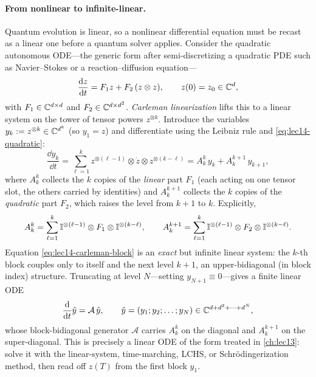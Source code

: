 \paragraph{From nonlinear to infinite-linear.}
Quantum evolution is linear, so a nonlinear differential equation must be recast as a linear one
before a quantum solver applies. Consider the quadratic autonomous ODE---the generic form after
semi-discretizing a quadratic PDE such as Navier--Stokes or a reaction--diffusion equation---
\begin{equation}
  \frac{\mathrm{d} z}{\mathrm{d} t}=F_1 z+F_2\,(z\otimes z),\qquad z(0)=z_0\in\mathbb{C}^d,
  \label{eq:lec14-quadratic}
\end{equation}
with $F_1\in\mathbb{C}^{d\times d}$ and $F_2\in\mathbb{C}^{d\times d^2}$. \emph{Carleman linearization} lifts this
to a linear system on the tower of tensor powers $z^{\otimes k}$. Introduce the variables
$y_k:=z^{\otimes k}\in\mathbb{C}^{d^k}$ (so $y_1=z$) and differentiate using the Leibniz rule and
\eqref{eq:lec14-quadratic}:
\begin{equation}
  \frac{\dd y_k}{\dd t}
  =\sum_{\ell=1}^{k}z^{\otimes(\ell-1)}\otimes\dot z\otimes z^{\otimes(k-\ell)}
  =A_k^k\,y_k+A_k^{k+1}\,y_{k+1},
  \label{eq:lec14-carleman-block}
\end{equation}
where $A_k^k$ collects the $k$ copies of the \emph{linear} part $F_1$ (each acting on one tensor
slot, the others carried by identities) and $A_k^{k+1}$ collects the $k$ copies of the
\emph{quadratic} part $F_2$, which raises the level from $k+1$ to $k$. Explicitly,
\begin{equation}
  A_k^k=\sum_{\ell=1}^{k}\mathbb{I}^{\otimes(\ell-1)}\otimes F_1\otimes\mathbb{I}^{\otimes(k-\ell)},
  \qquad
  A_k^{k+1}=\sum_{\ell=1}^{k}\mathbb{I}^{\otimes(\ell-1)}\otimes F_2\otimes\mathbb{I}^{\otimes(k-\ell)}.
  \label{eq:lec14-carleman-coeffs}
\end{equation}
Equation \eqref{eq:lec14-carleman-block} is an \emph{exact} but infinite linear system: the
$k$-th block couples only to itself and the next level $k+1$, an upper-bidiagonal (in block
index) structure. Truncating at level $N$---setting $y_{N+1}\equiv0$---gives a finite linear ODE
\begin{equation}
  \frac{\mathrm{d}}{\mathrm{d} t}\hat y=\mathcal A\,\hat y,\qquad
  \hat y=(y_1;y_2;\dots;y_N)\in\mathbb{C}^{d+d^2+\dots+d^N},
  \label{eq:lec14-carleman-trunc}
\end{equation}
whose block-bidiagonal generator $\mathcal A$ carries $A_k^k$ on the diagonal and $A_k^{k+1}$ on
the super-diagonal. This is precisely a linear ODE of the form treated in \cref{ch:lec13}: solve
it with the linear-system, time-marching, LCHS, or Schr\"odingerization method, then read off
$z(T)$ from the first block $y_1$.

